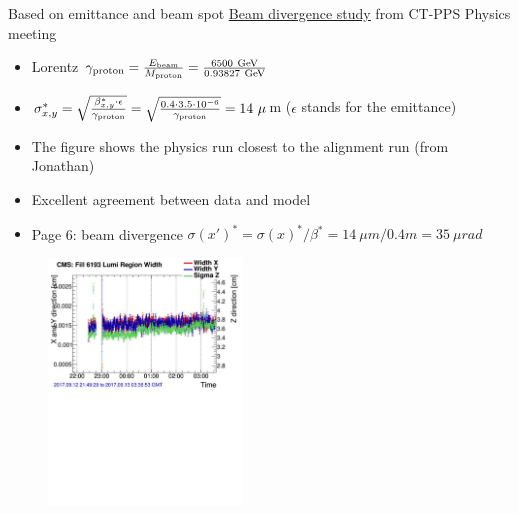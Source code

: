 \documentclass{beamer}
\begin{document}
\begin{frame}\scriptsize
	\begin{block}{Based on emittance and beam spot}
             \href{https://indico.cern.ch/event/672586/contributions/2751640/attachments/1539182/2412882/Summary.pdf}{\color{blue} \underline{\ttfamily Beam divergence study}} from CT-PPS Physics meeting
     		\begin{itemize}
			\item Lorentz $\gamma_{\rm proton}=\frac{E_{\rm beam}}{M_{\rm proton}}=\frac{6500~{\rm GeV}}{0.93827~{\rm GeV}}$
			\item $\sigma_{x,y}^{*}=\sqrt{\frac{\beta_{x,y}^{*}\cdot\epsilon}{\gamma_{\rm proton}}}=\sqrt{\frac{0.4\cdot3.5\cdot10^{-6}}{\gamma_{\rm proton}}}=14~\mu$m ($\epsilon$ stands for the emittance)
			\item The figure shows the physics run closest to the alignment run (from Jonathan)
			\item Excellent agreement between data and model
			\item Page 6: beam divergence $\sigma(x')^{*}=\sigma(x)^{*}/\beta^{*}=14~\mu m / 0.4 m=35~\mu rad$ 
		\end{itemize}
		\begin{figure}
			\includegraphics[trim = 0mm 140mm 0mm 0mm, clip, width=0.46\textwidth]{BS_Width_Fill6193_0.pdf}
		\end{figure}\vspace{-4mm}


	\end{block}
	
\end{frame}
\end{document}
